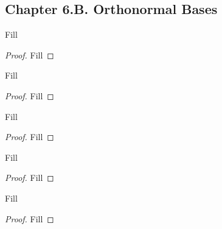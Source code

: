 \subsection*{Chapter 6.B. Orthonormal Bases}


\begin{exercise}{2}
  Fill
\end{exercise}
\begin{proof}
 Fill
\end{proof}

\begin{exercise}{11}
  Fill
\end{exercise}
\begin{proof}
 Fill
\end{proof}

\begin{exercise}{12}
  Fill
\end{exercise}
\begin{proof}
 Fill
\end{proof}

\begin{exercise}{15}
  Fill
\end{exercise}
\begin{proof}
 Fill
\end{proof}

\begin{exercise}{17}
  Fill
\end{exercise}
\begin{proof}
 Fill
\end{proof}
